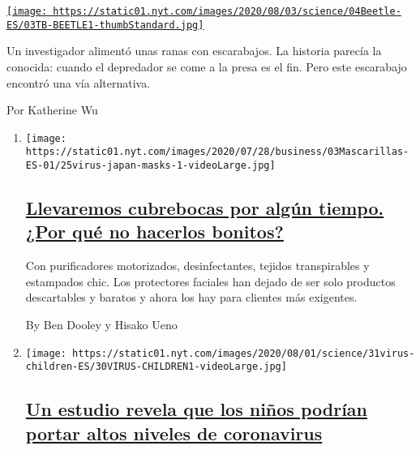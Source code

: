 \begin{enumerate}
\begin{enumerate}
    \href{/es/2020/08/04/espanol/ciencia-y-tecnologia/escarabajo-excremento-rana.html}{\texttt{[image: https://static01.nyt.com/images/2020/08/03/science/04Beetle-ES/03TB-BEETLE1-thumbStandard.jpg]}}

    Un investigador alimentó unas ranas con escarabajos. La historia
    parecía la conocida: cuando el depredador se come a la presa es el
    fin. Pero este escarabajo encontró una vía alternativa.

    Por Katherine Wu
  \end{enumerate}
\end{enumerate}

\begin{enumerate}
\def\labelenumi{\arabic{enumi}.}
\item
  \texttt{[image: https://static01.nyt.com/images/2020/07/28/business/03Mascarillas-ES-01/25virus-japan-masks-1-videoLarge.jpg]}

  \hypertarget{llevaremos-cubrebocas-por-alguxfan-tiempo-por-quuxe9-no-hacerlos-bonitos}{%
  \subsection{\texorpdfstring{\href{/es/2020/08/04/espanol/negocios/japon-cubrebocas.html}{Llevaremos
  cubrebocas por algún tiempo. ¿Por qué no hacerlos
  bonitos?}}{Llevaremos cubrebocas por algún tiempo. ¿Por qué no hacerlos bonitos?}}\label{llevaremos-cubrebocas-por-alguxfan-tiempo-por-quuxe9-no-hacerlos-bonitos}}

  Con purificadores motorizados, desinfectantes, tejidos transpirables y
  estampados chic. Los protectores faciales han dejado de ser solo
  productos descartables y baratos y ahora los hay para clientes más
  exigentes.

  By Ben Dooley y Hisako Ueno
\item
  \texttt{[image: https://static01.nyt.com/images/2020/08/01/science/31virus-children-ES/30VIRUS-CHILDREN1-videoLarge.jpg]}

  \hypertarget{un-estudio-revela-que-los-niuxf1os-podruxedan-portar-altos-niveles-de-coronavirus}{%
  \subsection{\texorpdfstring{\href{/es/2020/07/31/espanol/ciencia-y-tecnologia/ninos-contagio-coronavirus.html}{Un
  estudio revela que los niños podrían portar altos niveles de
  coronavirus}}{Un estudio revela que los niños podrían portar altos niveles de coronavirus}}\label{un-estudio-revela-que-los-niuxf1os-podruxedan-portar-altos-niveles-de-coronavirus}}


\end{enumerate}
